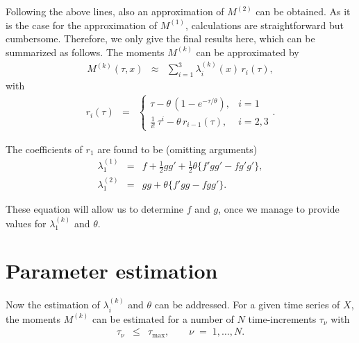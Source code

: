 \documentclass[aps,twocolumn,superscriptaddress,showpacs,showkeys]{revtex4}
\newcommand{\vecalpha}{{\boldsymbol{\alpha}}}
\begin{document}
Following the above lines, also an approximation of $M^{(2)}$ can be obtained.
As it is the case for the approximation of $M^{(1)}$, calculations are straightforward but cumbersome.
Therefore, we only give the final results here, which can be
summarized as follows. The moments $M^{(k)}$ can be approximated by
%
\begin{eqnarray}\label{Mk_lambda_r_final}
M^{(k)}(\tau,x) &\approx& \sum_{i=1}^3\lambda^{(k)}_i(x)\,r_i(\tau),
\end{eqnarray}
\noindent with
%
\begin{eqnarray}\label{def_r_i}
r_i(\tau) &=&
\left\{\begin{array}{ll}
  \tau - \theta\, (1-e^{-\tau/\theta})  ,& i=1\\[.3em]
  \frac{1}{i!}\,\tau^i - \theta\, r_{i-1}(\tau)  ,& i=2,3 
\end{array}\right. .
\end{eqnarray}

\noindent The coefficients of $r_1$ are found to be (omitting arguments)
%
\begin{subequations}\label{def_lambda_1_k}
\begin{eqnarray}
\lambda^{(1)}_1 &=& f +\frac{1}{2}gg' +\frac{1}{2}\theta\big\{ f'gg' -fg'g' \big\},\\
\lambda^{(2)}_1 &=& gg +\theta\big\{ f'gg-fgg' \big\}.
\end{eqnarray}
\end{subequations}

\noindent These equation will allow us to determine $f$ and $g$, once we manage to provide values for $\lambda^{(k)}_1$
and $\theta$.

\section{Parameter estimation}
\label{sec_estimation}

\noindent Now the estimation of $\lambda^{(k)}_i$ and $\theta$ can be addressed. For a given time series of $X$,
the moments $M^{(k)}$ can be estimated for a number of $N$ time-increments $\tau_\nu$ with
%
\begin{eqnarray}
\tau_\nu &\le& \tau_\text{max},\qquad \nu\;=\; 1,\ldots,N.
\end{eqnarray}
\end{document}
